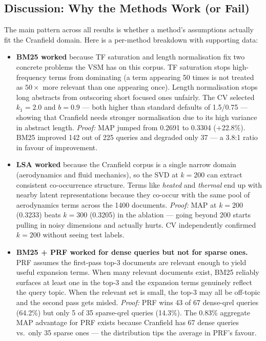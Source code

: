 \documentclass{article}
\begin{document}
\subsection{Discussion: Why the Methods Work (or Fail)}

The main pattern across all results is whether a method's assumptions actually fit the Cranfield domain. Here is a per-method breakdown with supporting data:

\begin{itemize}

\item \textbf{BM25 worked} because TF saturation and length normalisation fix two concrete problems the VSM has on this corpus. TF saturation stops high-frequency terms from dominating (a term appearing 50 times is not treated as $50\times$ more relevant than one appearing once). Length normalisation stops long abstracts from outscoring short focused ones unfairly. The CV selected $k_1{=}2.0$ and $b{=}0.9$ --- both higher than standard defaults of 1.5/0.75 --- showing that Cranfield needs stronger normalisation due to its high variance in abstract length. \textit{Proof:} MAP jumped from 0.2691 to 0.3304 (+22.8\%). BM25 improved 142 out of 225 queries and degraded only 37 --- a 3.8:1 ratio in favour of improvement.

\item \textbf{LSA worked} because the Cranfield corpus is a single narrow domain (aerodynamics and fluid mechanics), so the SVD at $k{=}200$ can extract consistent co-occurrence structure. Terms like \textit{heated} and \textit{thermal} end up with nearby latent representations because they co-occur with the same pool of aerodynamics terms across the 1400 documents. \textit{Proof:} MAP at $k{=}200$ (0.3233) beats $k{=}300$ (0.3205) in the ablation --- going beyond 200 starts pulling in noisy dimensions and actually hurts. CV independently confirmed $k{=}200$ without seeing test labels.

\item \textbf{BM25 + PRF worked for dense queries but not for sparse ones.} PRF assumes the first-pass top-3 documents are relevant enough to yield useful expansion terms. When many relevant documents exist, BM25 reliably surfaces at least one in the top-3 and the expansion terms genuinely reflect the query topic. When the relevant set is small, the top-3 may all be off-topic and the second pass gets misled. \textit{Proof:} PRF wins 43 of 67 dense-qrel queries (64.2\%) but only 5 of 35 sparse-qrel queries (14.3\%). The 0.83\% aggregate MAP advantage for PRF exists because Cranfield has 67 dense queries vs.\ only 35 sparse ones --- the distribution tips the average in PRF's favour.


\end{itemize}
\end{document}
